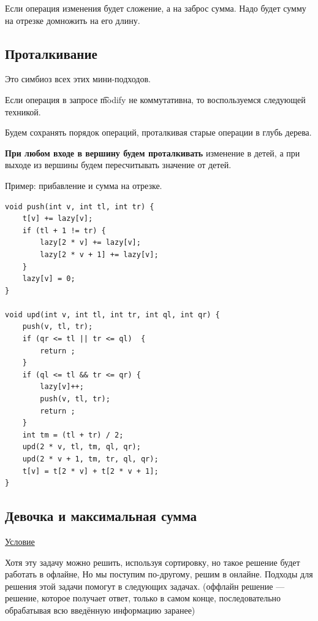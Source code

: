 Если операция изменения будет сложение, а на заброс сумма. Надо будет сумму на отрезке домножить на его длину.

\pagebreak

\subsection{Проталкивание}

Это симбиоз всех этих мини-подходов.

Если операция в запросе \t{modify} не коммутативна, то воспользуемся следующей техникой.

Будем сохранять порядок операций, проталкивая старые операции в глубь дерева.

{\bf При любом входе в вершину будем проталкивать} изменение в детей, а при выходе из вершины будем пересчитывать значение от детей.

Пример: прибавление и сумма на отрезке.


\up \up
\begin{verbatim}
void push(int v, int tl, int tr) {
    t[v] += lazy[v];
    if (tl + 1 != tr) {
        lazy[2 * v] += lazy[v];
        lazy[2 * v + 1] += lazy[v];
    }
    lazy[v] = 0;
}

void upd(int v, int tl, int tr, int ql, int qr) {
    push(v, tl, tr);
    if (qr <= tl || tr <= ql)  {
        return ;
    }
    if (ql <= tl && tr <= qr) {
        lazy[v]++;
        push(v, tl, tr);
        return ;
    }
    int tm = (tl + tr) / 2;
    upd(2 * v, tl, tm, ql, qr);
    upd(2 * v + 1, tm, tr, ql, qr);
    t[v] = t[2 * v] + t[2 * v + 1];
}
\end{verbatim}

\pagebreak

\subsection{Девочка и максимальная сумма}

\href{https://codeforces.com/contest/276/problem/C}{Условие} \href{https://codeforces.com/contest/276/submission/106207096}{}

Хотя эту задачу можно решить, используя сортировку, но такое решение будет работать в офлайне, Но мы поступим по-другому, решим в онлайне. Подходы для решения этой задачи помогут в следующих задачах. (оффлайн решение --- решение, которое получает ответ, только в самом конце, последовательно обрабатывая всю введённую информацию заранее)

